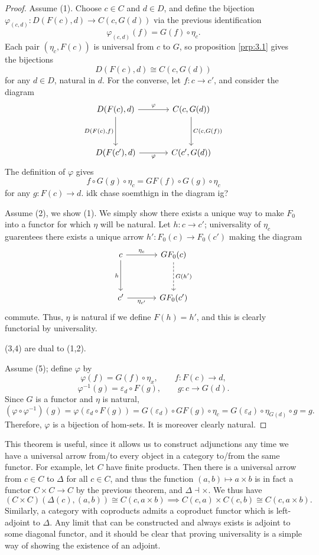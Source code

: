\begin{proof}
	Assume (1). Choose $c\in C$ and $d\in D$, and define the bijection $\varphi_{(c,d)}  : D(F(c),d) \to C(c,G(d))$ via the previous identification
	\[
		\varphi_{(c,d)} (f)=G(f)\circ \eta_c
	.\]
	Each pair $(\eta _c,F(c))$ is universal from $c$ to $G$, so proposition \ref{prp:3.1} gives the bijections
	\[
		D(F(c),d)\cong C(c,G(d))
	\]
	for any $d\in D$, natural in $d$. For the converse, let $f : c \to c'$, and consider the diagram
	\[\begin{tikzcd}[row sep = 3.5em, column sep = 3.5em]
	D(F(c),d)\ar[" \varphi ", r] \ar[" D(F(c)\text{,} f) "', d]  & C(c,G(d))\ar[" C(c\text{,} G(f)) ", d]  \\
	D(F(c'),d)\ar[" \varphi  "', r]  & C(c',G(d))
	\end{tikzcd}\]
	The definition of $\varphi $ gives
	\[
		f\circ G(g)\circ \eta _c=GF(f)\circ G(g)\circ \eta _c
	\]
	for any $g : F(c) \to d$. idk chase soemthign in the diagram ig?

	Assume (2), we show (1). We simply show there exists a unique way to make $F_0$ into a functor for which $\eta $ will be natural. Let $h : c \to c'$; universality of $\eta _c$ guarentees there exists a unique arrow $h':F_0(c)\to F_0(c')$ making the diagram
	\[\begin{tikzcd}[row sep = 3.5em, column sep = 3.5em]
	c\ar[" \eta _c ", r] \ar[" h "', d]  & GF_0(c)\ar[" G(h') ", dashed, d]  \\
	c'\ar[" \eta_{c'}  "', r]  & GF_0(c')
	\end{tikzcd}\]
	commute. Thus, $\eta $ is natural if we define $F(h)=h'$, and this is clearly functorial by universality.

	(3,4) are dual to (1,2).

	Assume (5); define $\varphi $ by
	\[
		\varphi (f)=G(f)\circ \eta _x,\qquad f : F(c) \to d,
	\]
	\[
		\varphi ^{-1} (g)=\varepsilon _d \circ F(g),\qquad g : c \to G(d)
	.\]
	Since $G$ is a functor and $\eta $ is natural,
	\[
		(\varphi \circ \varphi ^{-1} )(g)=\varphi (\varepsilon _d \circ F(g))=G(\varepsilon _d)\circ GF(g)\circ \eta _c=G(\varepsilon _d)\circ \eta_{G(d)} \circ g=g
	.\]
	Therefore, $\varphi $ is a bijection of hom-sets. It is moreover clearly natural.
\end{proof}

This theorem is useful, since it allows us to construct adjunctions any time we have a universal arrow from/to every object in a category to/from the same functor. For example, let $C$ have finite products. Then there is a universal arrow from $c\in C$ to $\Delta $ for all $c\in C$, and thus the function $(a,b)\mapsto a\times b$ is in fact a functor $C\times C\to C$ by the previous theorem, and $\Delta \dashv \times $. We thus have
\[
	(C\times C)(\Delta (c),(a,b))\cong C(c,a\times b)\implies C(c,a)\times C(c,b)\cong C(c,a\times b)
.\]
Similarly, a category with coproducts admits a coproduct functor which is left-adjoint to $\Delta $. Any limit that can be constructed and always exists is adjoint to some diagonal functor, and it should be clear that proving universality is a simple way of showing the existence of an adjoint.

